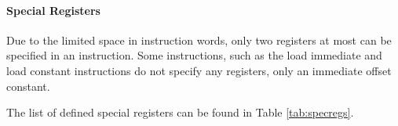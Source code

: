 
\FloatBarrier

\paragraph{Special Registers}

Due to the limited space in instruction words, only two registers at most can be
specified in an instruction. Some instructions, such as the load immediate and
load constant instructions do not specify any registers, only an immediate
offset constant.

The list of defined special registers can be found in Table \ref{tab:specregs}.


\FloatBarrier
